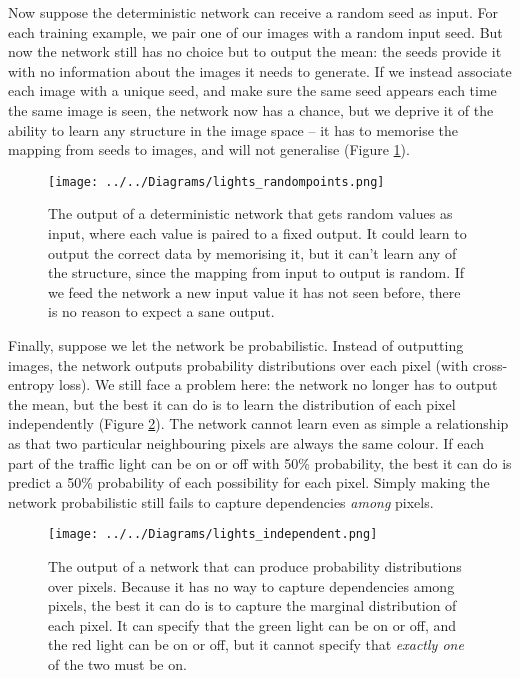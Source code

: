\documentclass[10pt,a4paper]{article}
\begin{document}
Now suppose the deterministic network can receive a random seed as input. For each training example, we pair one of our images with a random input seed. But now the network still has no choice but to output the mean: the seeds provide it with no information about the images it needs to generate. If we instead associate each image with a unique seed, and make sure the same seed appears each time the same image is seen, the network now has a chance, but we deprive it of the ability to learn any structure in the image space -- it has to memorise the mapping from seeds to images, and will not generalise (Figure \ref{randompoints}).

\begin{figure}
  \centering
  \texttt{[image: ../../Diagrams/lights\_randompoints.png]}
  \caption{The output of a deterministic network that gets random values as input, where each value is paired to a fixed output. It could learn to output the correct data by memorising it, but it can't learn any of the structure, since the mapping from input to output is random. If we feed the network a new input value it has not seen before, there is no reason to expect a sane output.}
  \label{randompoints}
\end{figure}

Finally, suppose we let the network be probabilistic. Instead of outputting images, the network outputs probability distributions over each pixel (with cross-entropy loss). We still face a problem here: the network no longer has to output the mean, but the best it can do is to learn the distribution of each pixel independently (Figure \ref{independent}). The network cannot learn even as simple a relationship as that two particular neighbouring pixels are always the same colour. If each part of the traffic light can be on or off with 50\% probability, the best it can do is predict a 50\% probability of each possibility for each pixel. Simply making the network probabilistic still fails to capture dependencies \emph{among} pixels.

\begin{figure}
  \centering
  \texttt{[image: ../../Diagrams/lights\_independent.png]}
  \caption{The output of a network that can produce probability distributions over pixels. Because it has no way to capture dependencies among pixels, the best it can do is to capture the marginal distribution of each pixel. It can specify that the green light can be on or off, and the red light can be on or off, but it cannot specify that \emph{exactly one} of the two must be on.}
  \label{independent}
\end{figure}
\end{document}
